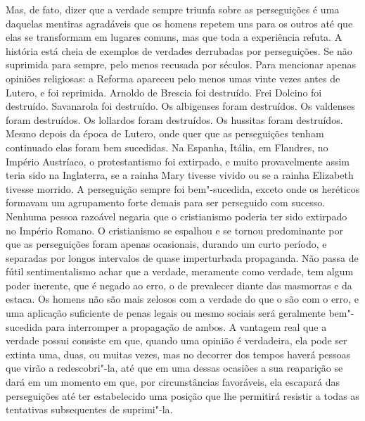 Mas, de fato, dizer que a verdade sempre triunfa sobre as perseguições
é uma daquelas mentiras agradáveis que os homens repetem uns para os
outros até que elas se transformam em lugares comuns, mas que toda a
experiência refuta. A história está cheia de exemplos de verdades
derrubadas por perseguições. Se não suprimida para sempre, pelo menos
recusada por séculos. Para mencionar apenas opiniões religiosas: a
Reforma apareceu pelo menos umas vinte vezes antes de Lutero, e foi
reprimida. Arnoldo de Brescia foi destruído. Frei Dolcino foi		%
destruído. Savanarola foi destruído. Os albigenses foram destruídos.
Os valdenses foram destruídos. Os lollardos foram destruídos. Os
hussitas foram destruídos. Mesmo depois da época de Lutero, onde quer
que as perseguições tenham continuado elas foram bem sucedidas. Na
Espanha, Itália, em Flandres, no Império Austríaco, o protestantismo
foi extirpado, e muito provavelmente assim teria sido na Inglaterra, se
a rainha Mary tivesse vivido ou se a rainha Elizabeth tivesse morrido.
A perseguição sempre foi bem"-sucedida, exceto onde os heréticos
formavam um agrupamento forte demais para ser perseguido com sucesso.
Nenhuma pessoa razoável negaria que o cristianismo poderia ter
sido \mbox{extirpado} no Império Romano. O cristianismo se espalhou e se
tornou predominante por que as perseguições foram apenas ocasionais,
durando um curto período, e separadas por longos intervalos de quase
imperturbada propaganda. Não passa de fútil
sentimentalismo achar que a verdade, meramente como verdade, tem algum
poder inerente, que é negado ao erro, o de prevalecer diante das
masmorras e da estaca. Os homens não são mais zelosos com a verdade do que
o são com o erro, e uma aplicação suficiente de penas legais ou mesmo
sociais será geralmente bem"-sucedida para interromper a
propagação de ambos. A vantagem real que a verdade possui consiste em
que, quando uma opinião é verdadeira, ela pode ser extinta uma, duas,
ou muitas vezes, mas no decorrer dos tempos haverá pessoas que virão a
redescobri"-la, até que em uma dessas ocasiões a sua reaparição se
dará em um momento em que, por circunstâncias favoráveis, ela escapará das
perseguições até ter estabelecido uma posição que lhe permitirá resistir
a todas as tentativas subsequentes de suprimi"-la. 

